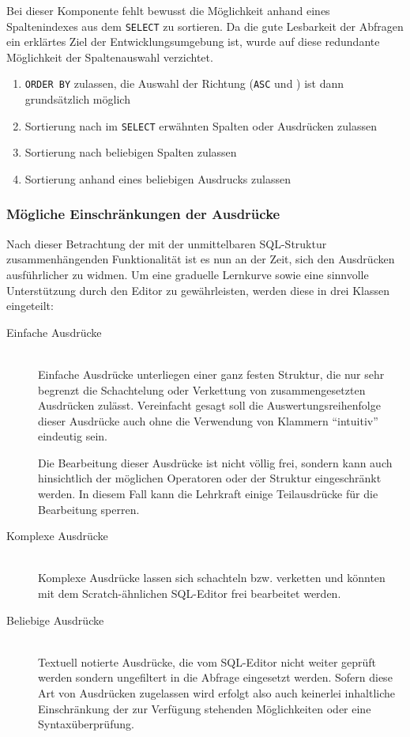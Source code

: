 \begin{enumerate}
  Bei dieser Komponente fehlt bewusst die Möglichkeit anhand eines Spaltenindexes aus dem \texttt{SELECT} zu sortieren. Da die gute Lesbarkeit der Abfragen ein erklärtes Ziel der Entwicklungsumgebung ist, wurde auf diese redundante Möglichkeit der Spaltenauswahl verzichtet.
  \begin{enumerate}
  \item \label{feat:order-allow} \texttt{ORDER BY} zulassen, die Auswahl der Richtung (\texttt{ASC} und ) ist dann grundsätzlich möglich
  \item \label{feat:order-select} Sortierung nach im \texttt{SELECT} erwähnten Spalten oder Ausdrücken zulassen
  \item \label{feat:order-any-column} Sortierung nach beliebigen Spalten zulassen
  \item \label{feat:order-expression} Sortierung anhand eines beliebigen Ausdrucks zulassen
  \end{enumerate}
\end{enumerate}

\subsubsection{Mögliche Einschränkungen der Ausdrücke}
\label{sec:sql-subset-expression}

Nach dieser Betrachtung der mit der unmittelbaren SQL-Struktur zusammenhängenden Funktionalität ist es nun an der Zeit, sich den Ausdrücken ausführlicher zu widmen. Um eine graduelle Lernkurve sowie eine sinnvolle Unterstützung durch den Editor zu gewährleisten, werden diese in drei Klassen eingeteilt:

\begin{description}
\item[Einfache Ausdrücke] \hfill\\
  Einfache Ausdrücke unterliegen einer ganz festen Struktur, die nur sehr begrenzt die Schachtelung oder Verkettung von zusammengesetzten Ausdrücken zulässt. Vereinfacht gesagt soll die Auswertungsreihenfolge dieser Ausdrücke auch ohne die Verwendung von Klammern ``intuitiv'' eindeutig sein.
  
  Die Bearbeitung dieser Ausdrücke ist nicht völlig frei, sondern kann auch hinsichtlich der möglichen Operatoren oder der Struktur eingeschränkt werden. In diesem Fall kann die Lehrkraft einige Teilausdrücke für die Bearbeitung sperren.
\item[Komplexe Ausdrücke] \hfill\\
  Komplexe Ausdrücke lassen sich schachteln bzw. verketten und könnten mit dem Scratch-ähnlichen SQL-Editor frei bearbeitet werden.
\item[Beliebige Ausdrücke] \hfill\\
  Textuell notierte Ausdrücke, die vom SQL-Editor nicht weiter geprüft werden sondern ungefiltert in die Abfrage eingesetzt werden. Sofern diese Art von Ausdrücken zugelassen wird erfolgt also auch keinerlei inhaltliche Einschränkung der zur Verfügung stehenden Möglichkeiten oder eine Syntaxüberprüfung.
\end{description}

